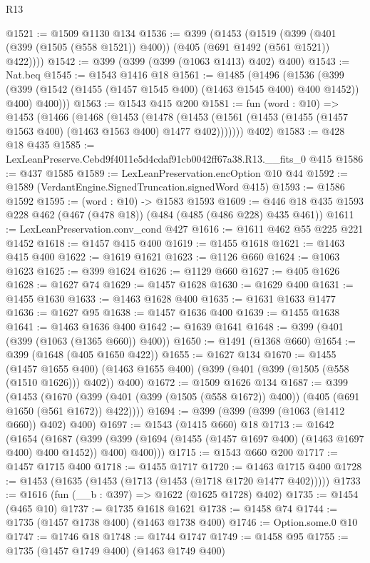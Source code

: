 \begin{lexlean}{R13}
\begin{coremodule}
@1521 := @1509 @1130 @134
@1536 := @399
    (@1453
      (@1519 (@399 (@401 (@399 (@1505 (@558 @1521)) @400)) (@405 (@691 @1492 (@561 @1521)) @422))))
@1542 := @399 (@399 (@399 (@1063 @1413) @402) @400)
@1543 := Nat.beq
@1545 := @1543 @1416 @18
@1561 := @1485
    (@1496
      (@1536
        (@399 (@399 (@1542 (@1455 (@1457 @1545 @400) (@1463 @1545 @400) @400 @1452)) @400) @400)))
@1563 := @1543 @415 @200
@1581 := fun (word : @10) =>
  @1453
    (@1466
      (@1468
        (@1453
          (@1478 (@1453 (@1561 (@1453 (@1455 (@1457 @1563 @400) (@1463 @1563 @400) @1477 @402)))))))
      @402)
@1583 := @428 @18 @435
@1585 := LexLeanPreserve.Cebd9f4011e5d4cdaf91cb0042ff67a38.R13.__fits_0 @415
@1586 := @437 @1585
@1589 := LexLeanPreservation.encOption @10 @44
@1592 := @1589 (VerdantEngine.SignedTruncation.signedWord @415)
@1593 := @1586 @1592
@1595 := (word : @10) -> @1583 @1593
@1609 := @446 @18 @435 @1593 @228 @462 (@467 (@478 @18)) (@484 (@485 (@486 @228) @435 @461))
@1611 := LexLeanPreservation.conv_cond @427
@1616 := @1611 @462 @55 @225 @221 @1452
@1618 := @1457 @415 @400
@1619 := @1455 @1618
@1621 := @1463 @415 @400
@1622 := @1619 @1621
@1623 := @1126 @660
@1624 := @1063 @1623
@1625 := @399 @1624
@1626 := @1129 @660
@1627 := @405 @1626
@1628 := @1627 @74
@1629 := @1457 @1628
@1630 := @1629 @400
@1631 := @1455 @1630
@1633 := @1463 @1628 @400
@1635 := @1631 @1633 @1477
@1636 := @1627 @95
@1638 := @1457 @1636 @400
@1639 := @1455 @1638
@1641 := @1463 @1636 @400
@1642 := @1639 @1641
@1648 := @399 (@401 (@399 (@1063 (@1365 @660)) @400))
@1650 := @1491 (@1368 @660)
@1654 := @399 (@1648 (@405 @1650 @422))
@1655 := @1627 @134
@1670 := @1455
    (@1457 @1655 @400)
    (@1463 @1655 @400)
    (@399 (@401 (@399 (@1505 (@558 (@1510 @1626))) @402)) @400)
@1672 := @1509 @1626 @134
@1687 := @399
    (@1453
      (@1670 (@399 (@401 (@399 (@1505 (@558 @1672)) @400)) (@405 (@691 @1650 (@561 @1672)) @422))))
@1694 := @399 (@399 (@399 (@1063 (@1412 @660)) @402) @400)
@1697 := @1543 (@1415 @660) @18
@1713 := @1642
    (@1654
      (@1687
        (@399 (@399 (@1694 (@1455 (@1457 @1697 @400) (@1463 @1697 @400) @400 @1452)) @400) @400)))
@1715 := @1543 @660 @200
@1717 := @1457 @1715 @400
@1718 := @1455 @1717
@1720 := @1463 @1715 @400
@1728 := @1453 (@1635 (@1453 (@1713 (@1453 (@1718 @1720 @1477 @402)))))
@1733 := @1616 (fun (__b : @397) => @1622 (@1625 @1728) @402)
@1735 := @1454 (@465 @10)
@1737 := @1735 @1618 @1621
@1738 := @1458 @74
@1744 := @1735 (@1457 @1738 @400) (@1463 @1738 @400)
@1746 := Option.some.{0} @10
@1747 := @1746 @18
@1748 := @1744 @1747
@1749 := @1458 @95
@1755 := @1735 (@1457 @1749 @400) (@1463 @1749 @400)

\end{coremodule}
\end{lexlean}
